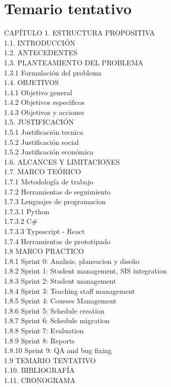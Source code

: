 \section{Temario tentativo}

CAPÍTULO 1. ESTRUCTURA PROPOSITIVA \\
1.1. INTRODUCCIÓN \\
1.2. ANTECEDENTES \\
1.3. PLANTEAMIENTO DEL PROBLEMA \\
1.3.1 Formulación del problema \\
1.4. OBJETIVOS \\
1.4.1 Objetivo general\\
1.4.2 Objetivos especificos \\
1.4.3 Objetivos y acciones \\
1.5. JUSTIFICACIÓN \\
1.5.1 Justificación tecnica\\
1.5.2 Justificación social \\
1.5.2 Justificación económica \\
1.6. ALCANCES Y LIMITACIONES \\
1.7. MARCO TEÓRICO \\
1.7.1 Metodología de trabajo \\
1.7.2 Herramientas de seguimiento  \\
1.7.3 Lenguajes de programacion  \\
1.7.3.1 Python  \\
1.7.3.2 C# \\
1.7.3.3 Typescript - React \\
1.7.4 Herramientas de prototipado  \\
1.8 MARCO PRACTICO \\
1.8.1 Sprint 0: Analisis, planeacion y diseño \\
1.8.2 Sprint 1: Student management, SIS integration \\
1.8.3 Sprint 2: Student management \\
1.8.4 Sprint 3: Teaching staff management \\
1.8.5 Sprint 4: Courses Management \\
1.8.6 Sprint 5: Schedule creation \\
1.8.7 Sprint 6: Schedule migration \\
1.8.8 Sprint 7: Evaluation \\
1.8.9 Sprint 8: Reports \\
1.8.10 Sprint 9: QA and bug fixing \\
1.9 TEMARIO TENTATIVO \\
1.10. BIBLIOGRAFÍA \\
1.11. CRONOGRAMA \\

